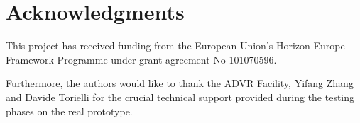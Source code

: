 \section*{Acknowledgments}
This project has received funding from the European Union's Horizon Europe Framework Programme under grant agreement No 101070596.

Furthermore, the authors would like to thank the ADVR Facility, Yifang Zhang and Davide Torielli for the crucial technical support provided during the testing phases on the real prototype.
